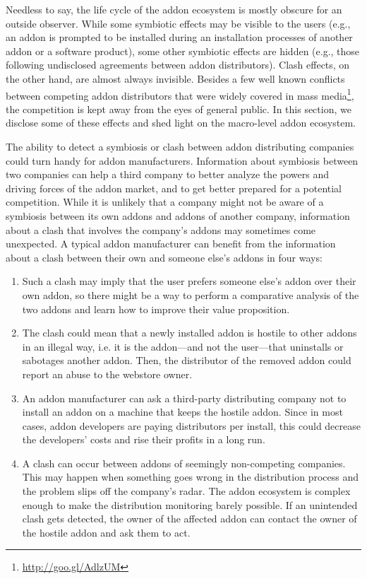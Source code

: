 \documentclass[ijoc,nonblindrev]{informs3} %
\numberwithin{equation}{subsection}
\begin{document}
Needless to say, the life cycle of the addon ecosystem is mostly obscure for an outside observer. While some symbiotic effects may be visible to the users (e.g., an addon is prompted to be installed during an installation processes of another addon or a software product), some other symbiotic effects are hidden (e.g., those following undisclosed agreements between addon distributors). Clash effects, on the other hand, are almost always invisible. Besides a few well known conflicts between competing addon distributors that were widely covered in mass media\footnote{\url{http://goo.gl/AdlzUM}}, the competition is kept away from the eyes of general public. In this section, we disclose some of these effects and shed light on the macro-level addon ecosystem. 

The ability to detect a symbiosis or clash between addon distributing companies could turn handy for addon manufacturers. Information about symbiosis between two companies can help a third company to better analyze the powers and driving forces of the addon market, and to get better prepared for a potential competition. While it is unlikely that a company might not be aware of a symbiosis between its own addons and addons of another company, information about a clash that involves the company's addons may sometimes come unexpected. A typical addon manufacturer can benefit from the information about a clash between their own and someone else's addons in four ways:
\begin{enumerate}
\item Such a clash may imply that the user prefers someone else's addon over their own addon, so there might be a way to perform a comparative analysis of the two addons and learn how to improve their value proposition.
\item The clash could mean that a newly installed addon is hostile to other addons in an illegal way, i.e. it is the addon---and not the user---that uninstalls or sabotages another addon. Then, the distributor of the removed addon could report an abuse to the webstore owner.
\item An addon manufacturer can ask a third-party distributing company not to install an addon on a machine that keeps the hostile addon. Since in most cases, addon developers are paying distributors per install, this could decrease the developers' costs and rise their profits in a long run.
\item A clash can occur between addons of seemingly non-competing companies. This may happen when something goes wrong in the distribution process and the problem slips off the company's radar. The addon ecosystem is complex enough to make the distribution monitoring barely possible. If an unintended clash gets detected, the owner of the affected addon can contact the owner of the hostile addon and ask them to act.
\end{enumerate}
\end{document}
